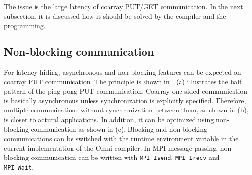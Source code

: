 The issue is the large latency of coarray PUT/GET communication.
In the next subsection, it is discussed how it should be solved 
by the compiler and the programming.



\subsection{Non-blocking communication}

For latency hiding, asynchronous and non-blocking features can be expected 
on coarray PUT communication.
The principle is shown in .
%
 (a) illustrates the half pattern of the ping-pong PUT communication.
Coarray one-sided communication is basically asynchronous unless 
synchronization is explicitly specified. Therefore, multiple communications
without synchronization between them, as shown in (b), is closer to actural applications.
In addition, it can be optimized using non-blocking communication as shown in (c).
Blocking and non-blocking communications can be switched with the runtime environment
variable in the current implementation of the Omni compiler.
In MPI message passing, non-blocking communication can be written with 
{\tt MPI\_Isend}, {\tt MPI\_Irecv} and {\tt MPI\_Wait}.


